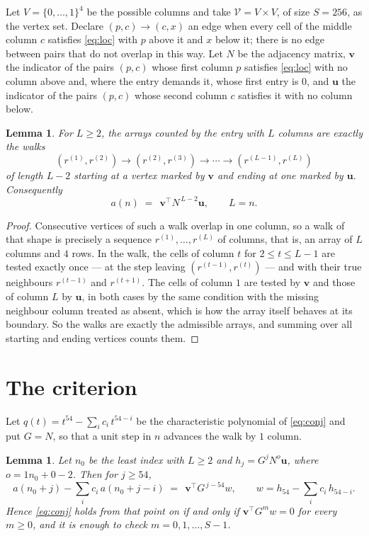 \documentclass[11pt,a4paper]{article}
\theoremstyle{plain}
\newtheorem{lemma}[theorem]{Lemma}
\theoremstyle{definition}
\begin{document}
Let $V=\{0,\dots,1\}^{4}$ be the possible columns and take
$\mathcal V=V\times V$, of size $S=256$, as the vertex set. Declare $(p,c)\to(c,x)$ an edge
when every cell of the middle column $c$ satisfies \eqref{eq:loc} with $p$ above it and $x$
below it; there is no edge between pairs that do not overlap in this way. Let $N$ be the
adjacency matrix, $\mathbf{v}$ the indicator of the pairs $(p,c)$ whose first column $p$
satisfies \eqref{eq:loc} with no column above and, where the entry demands it, whose first entry is $0$, and $\mathbf{u}$ the indicator of
the pairs $(p,c)$ whose second column $c$ satisfies it with no column below.

\begin{lemma}\label{lem:walk}
For $L\ge2$, the arrays counted by the entry with $L$ columns are exactly the walks
\[
(r^{(1)},r^{(2)})\to(r^{(2)},r^{(3)})\to\cdots\to(r^{(L-1)},r^{(L)})
\]
of length $L-2$ starting at a vertex marked by $\mathbf{v}$ and ending at one marked by
$\mathbf{u}$. Consequently
\[
a(n)\;=\;\,\mathbf{v}^{\!\top}N^{\,L-2}\mathbf{u},\qquad L=n .
\]
\end{lemma}

\begin{proof}
Consecutive vertices of such a walk overlap in one column, so a walk of that shape is
precisely a sequence $r^{(1)},\dots,r^{(L)}$ of columns, that is, an array of $L$ columns
and $4$ rows. In the walk, the cells of column $t$ for $2\le t\le L-1$ are tested
exactly once --- at the step leaving $(r^{(t-1)},r^{(t)})$ --- and with their true
neighbours $r^{(t-1)}$ and $r^{(t+1)}$. The cells of column $1$ are tested by
$\mathbf{v}$ and those of column $L$ by $\mathbf{u}$, in both cases by the same condition
with the missing neighbour column treated as absent, which is how the array itself behaves at
its boundary. So the walks are exactly the admissible arrays, and summing over all starting
and ending vertices counts them.
\end{proof}

\section{The criterion}

Let $q(t)=t^{54}-\sum_i c_i\,t^{54-i}$ be the characteristic polynomial of
\eqref{eq:conj} and put $G=N$, so that a unit step in $n$ advances the walk by
$1$ column.

\begin{lemma}\label{lem:crit}
Let $n_0$ be the least index with $L\ge2$ and $h_j=G^{j}N^{o}\mathbf{u}$, where
$o=1n_0+0-2$. Then for $j\ge54$,
\[
a(n_0+j)-\sum_i c_i\,a(n_0+j-i)\;=\;\,\mathbf{v}^{\!\top}G^{\,j-54}w,
\qquad w=h_{54}-\sum_i c_i\,h_{54-i} .
\]
Hence \eqref{eq:conj} holds from that point on if and only if
$\mathbf{v}^{\!\top}G^{m}w=0$ for every $m\ge0$, and it is enough to check
$m=0,1,\dots,S-1$.
\end{lemma}
\end{document}

